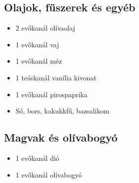 \begin{multicols}{2}
\subsection{Olajok, fűszerek és egyéb}
\begin{itemize}
    \item 2 evőkanál olívaolaj
    \item 1 evőkanál vaj
    \item 1 evőkanál méz
    \item 1 teáskanál vanília kivonat
    \item 1 evőkanál pirospaprika
    \item Só, bors, kakukkfű, bazsalikom
\end{itemize}

\subsection{Magvak és olívabogyó}
\begin{itemize}
    \item 1 evőkanál dió
    \item 1 evőkanál olívabogyó
\end{itemize}
\end{multicols}